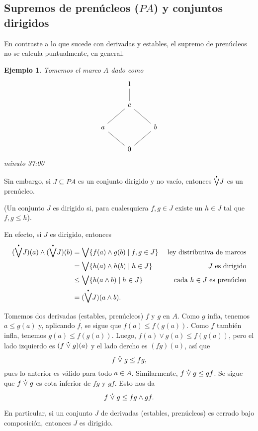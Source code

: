 \documentclass[12pt,letterpaper,titlepage]{article}
\newtheorem*{exa}{Ejemplo}
\theoremstyle{definition}
\renewcommand\sup{\vee}
\newcommand\Sup{\bigvee}
\renewcommand\inf{\wedge}
\newcommand\psup{%
    {\;\stackrel{\raisebox{-3pt}{\scalebox{0.4}{$\bullet$}}}{\vee}\;}
  }%
\newcommand\pSup{%
    {\stackrel{\raisebox{-3pt}{\scalebox{0.5}{$\bullet$}}}{\bigvee}}
  }%
\newcommand\tps[1]{\texorpdfstring{#1}{}}
\newcommand\<{\langle}
\renewcommand\>{\rangle}
\begin{document}
\subsection{Supremos de prenúcleos \tps{($PA$)} y conjuntos dirigidos}

En contraste a lo que sucede con derivadas y estables, el supremo
de prenúcleos no se calcula puntualmente, en general.

\begin{exa}
  Tomemos el marco $A$ dado como
  \[
    \begin{tikzcd}
      & 1 \\
      & c \ar[u,no head] \\
      a \ar[ur,no head] & & b \ar[ul,no head] \\
      & 0 \ar[ur, no head] \ar[ul, no head]
    \end{tikzcd}
  \]
  minuto 37:00
\end{exa}

Sin embargo, si $J\subseteq PA$ es un conjunto dirigido y no
vacío, entonces $\pSup J$ es un prenúcleo.

(Un conjunto $J$ es dirigido si, para cualesquiera $f,g\in J$
existe un $h\in J$ tal que $f,g\leq h$).

En efecto, si $J$ es dirigido, entonces
\begin{align*}
  (\pSup J)(a) \inf (\pSup J)(b)
  &= \Sup\{f(a)\inf g(b) \mid f,g\in J\}
    & \text{ ley distributiva de marcos} \\
  &= \Sup\{h(a) \inf h(b)  \mid h\in J \}
    & \text{ $J$ es dirigido} \\
  &\leq \Sup\{h(a \inf b)  \mid h\in J \}
    & \text{ cada $h\in J$ es prenúcleo} \\
  &= (\pSup J)(a\inf b).
\end{align*}

Tomemos dos derivadas (estables, prenúcleos) $f$ y $g$ en $A$.
Como $g$ infla, tenemos $a\leq g(a)$ y,
aplicando $f$, se sigue que $f(a)\leq f(g(a))$.
Como $f$ también infla, tenemos $g(a)\leq f(g(a))$.
Luego, $f(a)\sup g(a) \leq f(g(a))$, pero el lado izquierdo es
$(f\psup g)(a)$ y el lado dercho es $(fg)(a)$, así que
\[
  f\psup g \leq fg
,\]
pues lo anterior es válido para todo $a\in A$.
Similarmente, $f\psup g\leq gf$.
Se sigue que $f\psup g$ es cota inferior de $fg$ y $gf$.
Esto nos da
\[
  f\psup g \leq fg\inf gf
.\]

En particular, si un conjunto $J$ de derivadas (estables,
prenúcleos) es cerrado bajo composición, entonces $J$ es dirigido.
\end{document}
